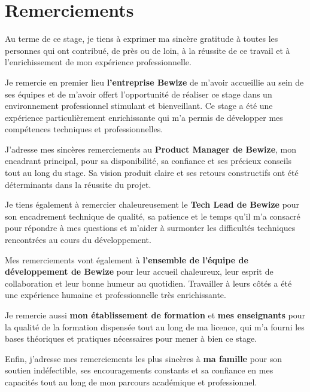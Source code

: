 \chapter*{Remerciements}

\vspace{0.5cm}

Au terme de ce stage, je tiens à exprimer ma sincère gratitude 
à toutes les personnes qui ont contribué, de près ou de loin, 
à la réussite de ce travail et à l'enrichissement de mon 
expérience professionnelle.

\vspace{0.5cm}

Je remercie en premier lieu \textbf{l'entreprise Bewize} de m'avoir 
accueillie au sein de ses équipes et de m'avoir offert l'opportunité 
de réaliser ce stage dans un environnement professionnel stimulant 
et bienveillant. Ce stage a été une expérience particulièrement 
enrichissante qui m'a permis de développer mes compétences techniques 
et professionnelles.

\vspace{0.5cm}

J'adresse mes sincères remerciements au \textbf{Product Manager de Bewize}, 
mon encadrant principal, pour sa disponibilité, sa confiance et 
ses précieux conseils tout au long du stage. Sa vision produit 
claire et ses retours constructifs ont été déterminants dans 
la réussite du projet.

\vspace{0.5cm}

Je tiens également à remercier chaleureusement le \textbf{Tech Lead 
de Bewize} pour son encadrement technique de qualité, sa patience 
et le temps qu'il m'a consacré pour répondre à mes questions 
et m'aider à surmonter les difficultés techniques rencontrées 
au cours du développement.

\vspace{0.5cm}

Mes remerciements vont également à \textbf{l'ensemble de l'équipe 
de développement de Bewize} pour leur accueil chaleureux, leur 
esprit de collaboration et leur bonne humeur au quotidien. 
Travailler à leurs côtés a été une expérience humaine et 
professionnelle très enrichissante.

\vspace{0.5cm}

Je remercie aussi \textbf{mon établissement de formation} et 
\textbf{mes enseignants} pour la qualité de la formation dispensée 
tout au long de ma licence, qui m'a fourni les bases théoriques 
et pratiques nécessaires pour mener à bien ce stage.

\vspace{0.5cm}

Enfin, j'adresse mes remerciements les plus sincères à 
\textbf{ma famille} pour son soutien indéfectible, ses encouragements 
constants et sa confiance en mes capacités tout au long de mon 
parcours académique et professionnel.

\vspace{1cm}

